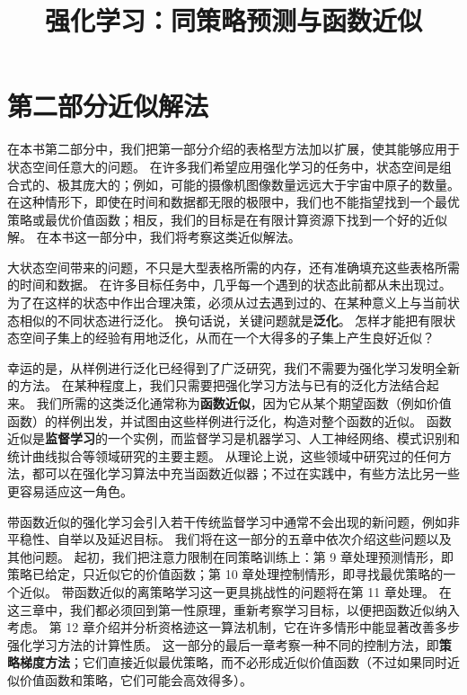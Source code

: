\documentclass[UTF8, 12pt, fontset=fandol, oneside]{ctexart}
\title{强化学习：同策略预测与函数近似}
\author{}
\date{}
\begin{document}
\maketitle

\section*{第二部分\quad 近似解法}

在本书第二部分中，我们把第一部分介绍的表格型方法加以扩展，使其能够应用于状态空间任意大的问题。
在许多我们希望应用强化学习的任务中，状态空间是组合式的、极其庞大的；例如，可能的摄像机图像数量远远大于宇宙中原子的数量。
在这种情形下，即使在时间和数据都无限的极限中，我们也不能指望找到一个最优策略或最优价值函数；相反，我们的目标是在有限计算资源下找到一个好的近似解。
在本书这一部分中，我们将考察这类近似解法。

大状态空间带来的问题，不只是大型表格所需的内存，还有准确填充这些表格所需的时间和数据。
在许多目标任务中，几乎每一个遇到的状态此前都从未出现过。
为了在这样的状态中作出合理决策，必须从过去遇到过的、在某种意义上与当前状态相似的不同状态进行泛化。
换句话说，关键问题就是\textbf{泛化}。
怎样才能把有限状态空间子集上的经验有用地泛化，从而在一个大得多的子集上产生良好近似？

幸运的是，从样例进行泛化已经得到了广泛研究，我们不需要为强化学习发明全新的方法。
在某种程度上，我们只需要把强化学习方法与已有的泛化方法结合起来。
我们所需的这类泛化通常称为\textbf{函数近似}，因为它从某个期望函数（例如价值函数）的样例出发，并试图由这些样例进行泛化，构造对整个函数的近似。
函数近似是\textbf{监督学习}的一个实例，而监督学习是机器学习、人工神经网络、模式识别和统计曲线拟合等领域研究的主要主题。
从理论上说，这些领域中研究过的任何方法，都可以在强化学习算法中充当函数近似器；不过在实践中，有些方法比另一些更容易适应这一角色。

带函数近似的强化学习会引入若干传统监督学习中通常不会出现的新问题，例如非平稳性、自举以及延迟目标。
我们将在这一部分的五章中依次介绍这些问题以及其他问题。
起初，我们把注意力限制在同策略训练上：第 9 章处理预测情形，即策略已给定，只近似它的价值函数；第 10 章处理控制情形，即寻找最优策略的一个近似。
带函数近似的离策略学习这一更具挑战性的问题将在第 11 章处理。
在这三章中，我们都必须回到第一性原理，重新考察学习目标，以便把函数近似纳入考虑。
第 12 章介绍并分析资格迹这一算法机制，它在许多情形中能显著改善多步强化学习方法的计算性质。
这一部分的最后一章考察一种不同的控制方法，即\textbf{策略梯度方法}；它们直接近似最优策略，而不必形成近似价值函数（不过如果同时近似价值函数和策略，它们可能会高效得多）。
\end{document}
